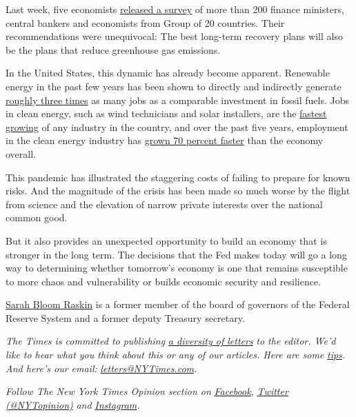 Last week, five economists
\href{https://www.smithschool.ox.ac.uk/publications/wpapers/workingpaper20-02.pdf}{released
a survey} of more than 200 finance ministers, central bankers and
economists from Group of 20 countries. Their recommendations were
unequivocal: The best long-term recovery plans will also be the plans
that reduce greenhouse gas emissions.

In the United States, this dynamic has already become apparent.
Renewable energy in the past few years has been shown to directly and
indirectly generate
\href{https://www.sciencedirect.com/science/article/abs/pii/S026499931630709X}{roughly
three times} as many jobs as a comparable investment in fossil fuels.
Jobs in clean energy, such as wind technicians and solar installers, are
the \href{https://www.bls.gov/ooh/fastest-growing.htm}{fastest growing}
of any industry in the country, and over the past five years, employment
in the clean energy industry has
\href{https://e2.org/wp-content/uploads/2020/04/E2-Clean-Jobs-America-2020.pdf}{grown
70 percent faster} than the economy overall.

This pandemic has illustrated the staggering costs of failing to prepare
for known risks. And the magnitude of the crisis has been made so much
worse by the flight from science and the elevation of narrow private
interests over the national common good.

But it also provides an unexpected opportunity to build an economy that
is stronger in the long term. The decisions that the Fed makes today
will go a long way to determining whether tomorrow's economy is one that
remains susceptible to more chaos and vulnerability or builds economic
security and resilience.

\href{https://law.duke.edu/fac/raskin/}{Sarah Bloom Raskin} is a former
member of the board of governors of the Federal Reserve System and a
former deputy Treasury secretary.

\emph{The Times is committed to publishing}
\href{https://www.nytimes3xbfgragh.onion/2019/01/31/opinion/letters/letters-to-editor-new-york-times-women.html}{\emph{a
diversity of letters}} \emph{to the editor. We'd like to hear what you
think about this or any of our articles. Here are some}
\href{https://help.nytimes3xbfgragh.onion/hc/en-us/articles/115014925288-How-to-submit-a-letter-to-the-editor}{\emph{tips}}\emph{.
And here's our email:}
\href{mailto:letters@NYTimes.com}{\emph{letters@NYTimes.com}}\emph{.}

\emph{Follow The New York Times Opinion section on}
\href{https://www.facebookcorewwwi.onion/nytopinion}{\emph{Facebook}}\emph{,}
\href{http://twitter.com/NYTOpinion}{\emph{Twitter (@NYTopinion)}}
\emph{and}
\href{https://www.instagram.com/nytopinion/}{\emph{Instagram}}\emph{.}

